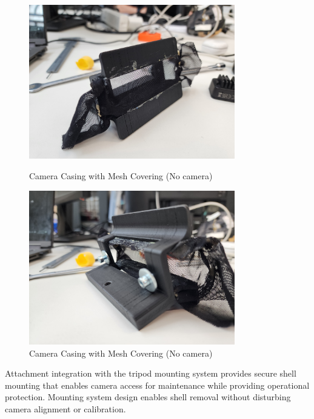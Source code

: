 \begin{figure}[H]
    \centering
    \begin{minipage}{0.45\textwidth}
        \centering
        \includegraphics[width=0.8\textwidth]{Images/CameraCasingMesh.jpg}
        \caption{Camera Casing with Mesh Covering (No camera)} 
        \label{fig:camera_casing_mesh}
    \end{minipage}
    \hfill
    \begin{minipage}{0.45\textwidth}
        \centering
        \includegraphics[width=0.8\textwidth]{Images/CameraCasingMesh (2).jpg}
        \caption{Camera Casing with Mesh Covering (No camera)}
        \label{fig:camera_casing_mesh_back}
    \end{minipage}
\end{figure}

Attachment integration with the tripod mounting system provides secure shell mounting that enables camera access for maintenance while providing operational protection. Mounting system design enables shell removal without disturbing camera alignment or calibration.

